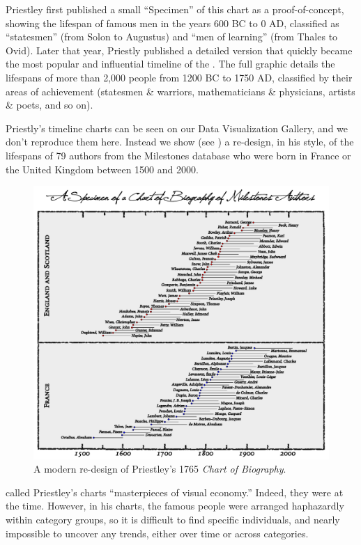 Priestley first published a small ``Specimen'' of this chart as a proof-of-concept, showing the lifespan of famous men in the years 600 BC to 0 AD, classified as ``statesmen'' (from Solon to Augustus) and ``men of learning'' (from Thales to Ovid). Later that year, Priestly published a detailed version \citeyear{Priestley:1765} that quickly became the most popular and influential timeline of the .  The full graphic details the lifespans of more than 2,000 people from 1200 BC to 1750 AD, classified by their areas of achievement (statesmen \& warriors, mathematicians \& physicians, artists \& poets, and so on).

Priestly's timeline charts can be seen on our Data Visualization Gallery, and we don't reproduce them here.  Instead we show (see ) a re-design, in his style, of the lifespans of 79 authors from the Milestones database who were born in France or the United Kingdom between 1500 and 2000. 

\begin{figure}[!htb]
  \centering
  \includegraphics[width=.95\textwidth,clip]{fig/timespan}
  \caption{A modern re-design of Priestley's 1765 \emph{Chart of Biography}.}
  \label{fig:timespan}
\end{figure}

\citet[p. 117]{RosenbergGrafton:2010} called Priestley's charts ``masterpieces of visual economy.'' Indeed, they were at the time.  However, in his charts, the famous people were arranged haphazardly within category groups, so it is difficult to find specific individuals, and nearly impossible to uncover any trends, either over time or across categories. 

